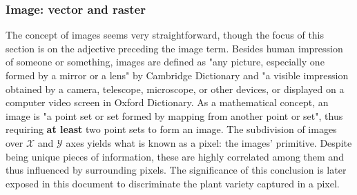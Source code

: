 \subsubsection{Image: vector and raster}

The concept of images seems very straightforward, though the focus of this section is on the adjective preceding the image term. Besides human impression of someone or something, images are defined as "any picture, especially one formed by a mirror or a lens" by Cambridge Dictionary and "a visible impression obtained by a camera, telescope, microscope, or other devices, or displayed on a computer video screen in Oxford Dictionary. As a mathematical concept, an image is "a point set or set formed by mapping from another point or set", thus requiring \textbf{at least} two point sets to form an image. The subdivision of images over $\mathcal{X}$ and $\mathcal{Y}$ axes yields what is known as a pixel: the images' primitive. Despite being unique pieces of information, these are highly correlated among them and thus influenced by surrounding pixels. The significance of this conclusion is later exposed in this document to discriminate the plant variety captured in a pixel.

